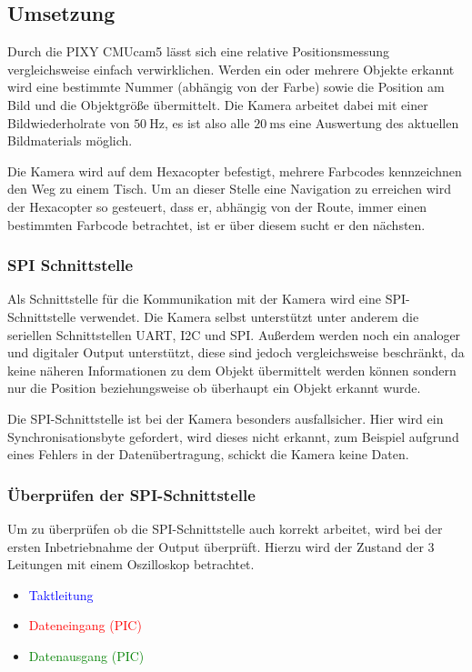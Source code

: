   \subsection{Umsetzung}
  Durch die PIXY CMUcam5 lässt sich eine relative Positionsmessung vergleichsweise einfach verwirklichen.
  Werden ein oder mehrere Objekte erkannt wird eine bestimmte Nummer (abhängig von der Farbe) sowie die Position am Bild und die Objektgröße übermittelt.
  Die Kamera arbeitet dabei mit einer Bildwiederholrate von $\SI{50}{\hertz}$, es ist also alle $\SI{20}{\milli\second}$ eine Auswertung des aktuellen Bildmaterials möglich.

  Die Kamera wird auf dem Hexacopter befestigt, mehrere Farbcodes kennzeichnen den Weg zu einem Tisch.
  Um an dieser Stelle eine Navigation zu erreichen wird der Hexacopter so gesteuert, dass er, abhängig von der Route,
  immer einen bestimmten Farbcode betrachtet, ist er über diesem sucht er den nächsten.

    \subsubsection{SPI Schnittstelle}
    Als Schnittstelle für die Kommunikation mit der Kamera wird eine SPI-Schnittstelle verwendet.
    Die Kamera selbst unterstützt unter anderem die seriellen Schnittstellen UART, I2C und SPI.
    Außerdem werden noch ein analoger und digitaler Output unterstützt, diese sind jedoch vergleichsweise beschränkt,
    da keine näheren Informationen zu dem Objekt übermittelt werden können sondern nur die Position beziehungsweise ob überhaupt ein Objekt erkannt wurde.

    Die SPI-Schnittstelle ist bei der Kamera besonders ausfallsicher. Hier wird ein Synchronisationsbyte gefordert, wird dieses nicht erkannt,
    zum Beispiel aufgrund eines Fehlers in der Datenübertragung, schickt die Kamera keine Daten.

    \subsubsection*{Überprüfen der SPI-Schnittstelle}
    Um zu überprüfen ob die SPI-Schnittstelle auch korrekt arbeitet, wird bei der ersten Inbetriebnahme der Output überprüft.
    Hierzu wird der Zustand der 3 Leitungen mit einem Oszilloskop betrachtet.
    \begin{itemize}
      \item \textcolor{blue}{Taktleitung}
      \item \textcolor{red}{Dateneingang (PIC)}
      \item \textcolor{green}{Datenausgang (PIC)}
    \end{itemize}

